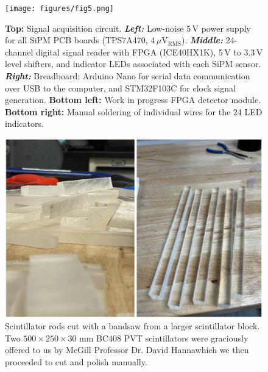 \begin{figure} [h]
    \centering
    \texttt{[image: figures/fig5.png]}
    \caption{\textbf{Top:} Signal acquisition circuit. \textbf{\textit{Left:}} Low-noise 5\,V power supply for all SiPM PCB boards (TPS7A470, $4\,\mu\text{V}_\text{RMS}$). \textbf{\textit{Middle:}} 24-channel digital signal reader with FPGA (ICE40HX1K), 5\,V to 3.3\,V level shifters, and indicator LEDs associated with each SiPM sensor. \textbf{\textit{Right:}} Breadboard: Arduino Nano for serial data communication over USB to the computer, and STM32F103C for clock signal generation. \textbf{Bottom left:} Work in progress FPGA detector module. \textbf{Bottom right:} Manual soldering of individual wires for the 24 LED indicators.}
    \label{fig5}
\end{figure}


\begin{figure}[h] 
    \centering 
    \includegraphics[scale=0.6]{figures/fig6.png}
    \caption{Scintillator rods cut with a bandsaw from a larger
scintillator block. Two $500\times250\times30$ mm BC408 PVT scintillators were graciously offered to us by McGill Professor Dr. David Hanna\textemdash which we then proceeded to cut and polish manually.}
    \label{fig6}
\end{figure}



